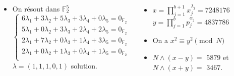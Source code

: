\documentclass{beamer}
\begin{document}
\begin{frame}


{\small
\begin{columns}
\begin{itemize}[<+->]
    \item On résout dans $\mathbb F_2^5$
    \[
    \begin{cases}
    6\lambda_1 + 3\lambda_2 + 5\lambda_3 + 3\lambda_4 + 0\lambda_5 = 0_{\mathbb F_2} \\
    5\lambda_1 + 0\lambda_2 + 3\lambda_3 + 2\lambda_4 + 2\lambda_5 = 0_{\mathbb F_2} \\
    2\lambda_1 + 7\lambda_2 + 0\lambda_3 + 1\lambda_4 + 3\lambda_5 = 0_{\mathbb F_2} \\
    2\lambda_1 + 0\lambda_2 + 1\lambda_3 + 0\lambda_4 + 1\lambda_5 = 0_{\mathbb F_2} \\
    \end{cases}
    \]
    $\lambda = (1, 1, 1, 0, 1)$ solution.
\end{itemize}

\begin{itemize}[<+->]
    \item $x = \prod_{j=1}^{b+1}x_j^{\lambda_j} = 7248176$ \\ $y = \prod_{j=1}^b p_j^{\alpha_j} = 4837786$
    \item On a $x^2 \equiv y^2 \pmod N$
    \item $N \land (x-y) =$ \alert<6>{$5879$} et $N \land  (x+y) =$ \alert<6>{$3467$}.
\end{itemize}

\end{columns}
}
\end{frame}
\end{document}
